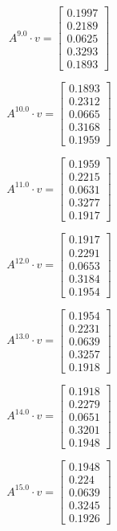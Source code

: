 \documentclass{article}
\begin{document}
  $$A^{9.0} \cdot v = \begin{bmatrix}
  0.1997\\
  0.2189\\
  0.0625\\
  0.3293\\
  0.1893
  \end{bmatrix}
  $$
  
  $$A^{10.0} \cdot v = \begin{bmatrix}
  0.1893\\
  0.2312\\
  0.0665\\
  0.3168\\
  0.1959
  \end{bmatrix}
  $$
  
  $$A^{11.0} \cdot v = \begin{bmatrix}
  0.1959\\
  0.2215\\
  0.0631\\
  0.3277\\
  0.1917
  \end{bmatrix}
  $$
  
  $$A^{12.0} \cdot v = \begin{bmatrix}
  0.1917\\
  0.2291\\
  0.0653\\
  0.3184\\
  0.1954
  \end{bmatrix}
  $$
  
  $$A^{13.0} \cdot v = \begin{bmatrix}
  0.1954\\
  0.2231\\
  0.0639\\
  0.3257\\
  0.1918
  \end{bmatrix}
  $$
  
  $$A^{14.0} \cdot v = \begin{bmatrix}
  0.1918\\
  0.2279\\
  0.0651\\
  0.3201\\
  0.1948
  \end{bmatrix}
  $$
  
  $$A^{15.0} \cdot v = \begin{bmatrix}
  0.1948\\
  0.224\\
  0.0639\\
  0.3245\\
  0.1926
  \end{bmatrix}
  $$
  
\end{document}
